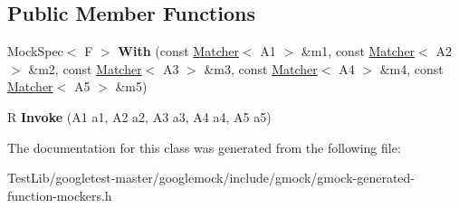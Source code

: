 \subsection*{Public Member Functions}
\begin{DoxyCompactItemize}
\item 
\mbox{\label{classtesting_1_1internal_1_1FunctionMocker_3_01R_07A1_00_01A2_00_01A3_00_01A4_00_01A5_08_4_a7e4e647056de7d10d6a7259a14b5535b}} 
Mock\+Spec$<$ F $>$ {\bfseries With} (const \hyperlink{classtesting_1_1Matcher}{Matcher}$<$ A1 $>$ \&m1, const \hyperlink{classtesting_1_1Matcher}{Matcher}$<$ A2 $>$ \&m2, const \hyperlink{classtesting_1_1Matcher}{Matcher}$<$ A3 $>$ \&m3, const \hyperlink{classtesting_1_1Matcher}{Matcher}$<$ A4 $>$ \&m4, const \hyperlink{classtesting_1_1Matcher}{Matcher}$<$ A5 $>$ \&m5)
\item 
\mbox{\label{classtesting_1_1internal_1_1FunctionMocker_3_01R_07A1_00_01A2_00_01A3_00_01A4_00_01A5_08_4_a481d6a28daaba552a9d36a9d67e4a3db}} 
R {\bfseries Invoke} (A1 a1, A2 a2, A3 a3, A4 a4, A5 a5)
\end{DoxyCompactItemize}


The documentation for this class was generated from the following file\+:\begin{DoxyCompactItemize}
\item 
Test\+Lib/googletest-\/master/googlemock/include/gmock/gmock-\/generated-\/function-\/mockers.\+h\end{DoxyCompactItemize}
